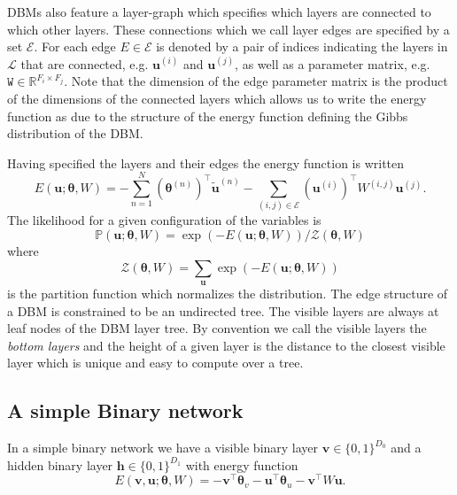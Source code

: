 \documentclass{article} %
\begin{document}
DBMs also feature a layer-graph which specifies which layers are
connected to which other layers.  These connections which we call
layer edges are specified by a set $\mathcal{E}$.  For each edge
$E\in\mathcal{E}$ is denoted by a pair of indices indicating the
layers in $\mathcal{L}$ that are connected, e.g. $\mathbf{u}^{(i)}$
and $\mathbf{u}^{(j)}$, as well as a parameter matrix,
e.g. $\mathtt{W}\in \mathbb{R}^{F_i\times F_j}$.  Note that the
dimension of the edge parameter matrix is the product of the
dimensions of the connected layers which allows us to write the energy function as due to the structure of the energy
function defining the Gibbs distribution of the DBM.

Having specified the layers and their edges the energy function is written
\begin{equation}
E(\mathbf{u}; \boldsymbol{\theta},W)= -\sum_{n=1}^N (\boldsymbol{\theta}^{(n)})^\top\tilde{\mathbf{u}}^{(n)} 
- \sum_{(i,j)\in\mathcal{E}} (\mathbf{u}^{(i)})^\top W^{(i,j)}\mathbf{u}^{(j)}.
\end{equation}
The likelihood for a given configuration of the variables is
\begin{equation}
\mathbb{P}(\mathbf{u}; \boldsymbol{\theta},W) = \exp(-E(\mathbf{u};\boldsymbol{\theta},W))/\mathcal{Z}(\boldsymbol{\theta},W)
\end{equation}
where 
\begin{equation}
\mathcal{Z}(\boldsymbol{\theta},W)=\sum_{\mathbf{u}} \exp(-E(\mathbf{u};\boldsymbol{\theta},W))
\end{equation}
is the partition function which normalizes the distribution.
The edge structure of a DBM is constrained to be an undirected tree.  The visible layers are always at leaf nodes
of the DBM layer tree.  By convention we call the visible layers the {\it bottom layers} and the height of a given
layer is the distance to the closest visible layer which is unique and easy to compute over a tree.



\subsection{A simple Binary network}

In a simple binary network we have a visible binary layer $\mathbf{v}\in\{0,1\}^{D_0}$ and a hidden binary layer
$\mathbf{h}\in\{0,1\}^{D_1}$ with energy function
\begin{equation}
E(\mathbf{v},\mathbf{u};\boldsymbol{\theta},W) = -\mathbf{v}^\top \boldsymbol{\theta}_v - \mathbf{u}^\top \boldsymbol{\theta}_u - \mathbf{v}^\top W \mathbf{u}.
\end{equation}
\end{document}
